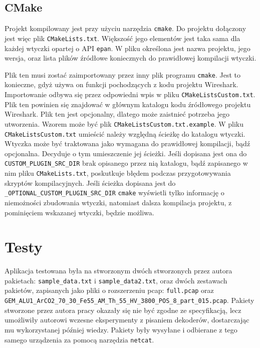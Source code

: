 \documentclass[a4paper, 12pt, twoside, openright]{article}
\begin{document}
\subsection{CMake}

Projekt kompilowany jest przy użyciu narzędzia \texttt{cmake}. Do projektu dołączony jest więc plik \texttt{CMakeLists.txt}.
Większość jego elementów jest taka sama dla każdej wtyczki opartej o API \texttt{epan}.
W pliku określona jest nazwa projektu, jego wersja, oraz lista plików źródłowe koniecznych do prawidłowej kompilacji wtyczki.

Plik ten musi zostać zaimportowany przez inny plik programu \texttt{cmake}. Jest to konieczne, gdyż używa on funkcji pochodzących z kodu projektu Wireshark.
Importowanie odbywa się przez odpowiedni wpis w pliku \texttt{CMakeListsCustom.txt}. Plik ten powinien się znajdować w głównym katalogu kodu źródłowego
projektu Wireshark. Plik ten jest opcjonalny, dlatego może zaistnieć potrzeba jego utworzenia. Wzorem może być plik \texttt{CMakeListsCustom.txt.example}.
W pliku \texttt{CMakeListsCustom.txt} umieścić należy względną ścieżkę do katalogu wtyczki. Wtyczka może być traktowana jako wymagana do prawidłowej kompilacji, bądź opcjonalna.
Decyduje o tym umieszczenie jej ścieżki. Jeśli dopisana jest ona do \texttt{CUSTOM\_PLUGIN\_SRC\_DIR} brak opisanego przez nią katalogu, bądź zapisanego w nim pliku \texttt{CMakeLists.txt},
poskutkuje błędem podczas przygotowywania skryptów kompilacyjnych. Jeśli ścieżka dopisana jest do \texttt{\_OPTIONAL\_CUSTOM\_PLUGIN\_SRC\_DIR} \texttt{cmake}
wyświetli tylko informację o niemożności zbudowania wtyczki, natomiast dalsza kompilacja projektu, z pominięciem wskazanej wtyczki, będzie możliwa.

\newpage
\section{Testy}

Aplikacja testowana była na stworzonym dwóch stworzonych przez autora pakietach: \texttt{sample\_data.txt}
i \texttt{sample\_data2.txt}, oraz dwóch zestawach pakietów, zapisanych jako pliki o rozszerzeniu pcap:
\texttt{full.pcap} oraz \texttt{GEM\_ALU1\_ArCO2\_70\_30\_Fe55\_AM\_Th\_55\_HV\_3800\_POS\_8\_part\_015.pcap}.
Pakiety stworzone przez autora pracy okazały się nie być zgodne ze specyfikacją, lecz umożliwiły autorowi
wczesne eksperymenty z pisaniem dekoderów, dostarczając mu wykorzystanej później wiedzy. Pakiety były wysyłane
i odbierane z tego samego urządzenia za pomocą narzędzia \texttt{netcat}.
\end{document}
